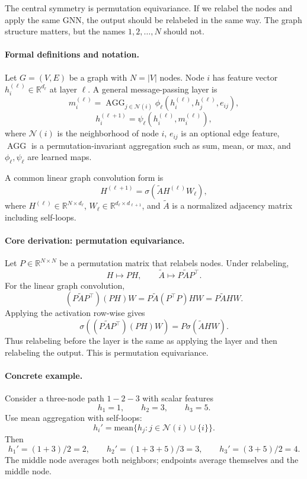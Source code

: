 The central symmetry is permutation equivariance. If we relabel the nodes and apply the same GNN, the output should be relabeled in the same way. The graph structure matters, but the names \(1,2,\ldots,N\) should not.

\paragraph{Formal definitions and notation.}
Let \(G=(V,E)\) be a graph with \(N=|V|\) nodes. Node \(i\) has feature vector \(h_i^{(\ell)}\in\mathbb{R}^{d_\ell}\) at layer \(\ell\). A general message-passing layer is
\[
m_i^{(\ell)}=\operatorname{AGG}_{j\in\mathcal{N}(i)}
\phi_\ell\!\left(h_i^{(\ell)},h_j^{(\ell)},e_{ij}\right),
\]
\[
h_i^{(\ell+1)}
=\psi_\ell\!\left(h_i^{(\ell)},m_i^{(\ell)}\right),
\]
where \(\mathcal{N}(i)\) is the neighborhood of node \(i\), \(e_{ij}\) is an optional edge feature, \(\operatorname{AGG}\) is a permutation-invariant aggregation such as sum, mean, or max, and \(\phi_\ell,\psi_\ell\) are learned maps.

A common linear graph convolution form is
\[
H^{(\ell+1)}=\sigma(\widetilde A H^{(\ell)}W_\ell),
\]
where \(H^{(\ell)}\in\mathbb{R}^{N\times d_\ell}\), \(W_\ell\in\mathbb{R}^{d_\ell\times d_{\ell+1}}\), and \(\widetilde A\) is a normalized adjacency matrix including self-loops.

\paragraph{Core derivation: permutation equivariance.}
Let \(P\in\mathbb{R}^{N\times N}\) be a permutation matrix that relabels nodes. Under relabeling,
\[
H\mapsto PH,\qquad \widetilde A\mapsto P\widetilde A P^\top.
\]
For the linear graph convolution,
\[
(P\widetilde A P^\top)(PH)W
=P\widetilde A (P^\top P)HW
=P\widetilde A HW.
\]
Applying the activation row-wise gives
\[
\sigma((P\widetilde A P^\top)(PH)W)=P\sigma(\widetilde AHW).
\]
Thus relabeling before the layer is the same as applying the layer and then relabeling the output. This is permutation equivariance.

\paragraph{Concrete example.}
Consider a three-node path \(1-2-3\) with scalar features
\[
h_1=1,\qquad h_2=3,\qquad h_3=5.
\]
Use mean aggregation with self-loops:
\[
h_i'=\text{mean}\{h_j:j\in\mathcal{N}(i)\cup\{i\}\}.
\]
Then
\[
h_1'=(1+3)/2=2,\qquad
h_2'=(1+3+5)/3=3,\qquad
h_3'=(3+5)/2=4.
\]
The middle node averages both neighbors; endpoints average themselves and the middle node.

